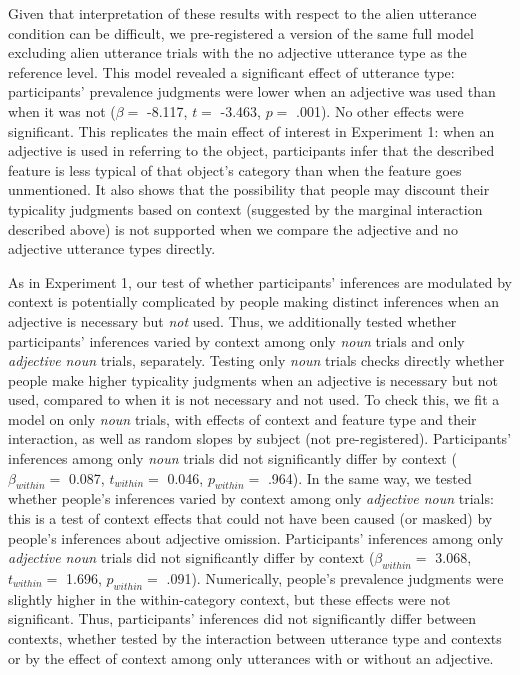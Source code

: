 \documentclass{ucetd}
\begin{document}
Given that interpretation of these results with respect to the alien
utterance condition can be difficult, we pre-registered a version of the
same full model excluding alien utterance trials with the no adjective
utterance type as the reference level. This model revealed a significant
effect of utterance type: participants' prevalence judgments were lower
when an adjective was used than when it was not (\(\beta =\) -8.117,
\(t =\) -3.463, \(p =\) .001). No other effects were significant. This
replicates the main effect of interest in Experiment 1: when an
adjective is used in referring to the object, participants infer that
the described feature is less typical of that object's category than
when the feature goes unmentioned. It also shows that the possibility
that people may discount their typicality judgments based on context
(suggested by the marginal interaction described above) is not supported
when we compare the adjective and no adjective utterance types directly.

As in Experiment 1, our test of whether participants' inferences are
modulated by context is potentially complicated by people making
distinct inferences when an adjective is necessary but \emph{not} used.
Thus, we additionally tested whether participants' inferences varied by
context among only \emph{noun} trials and only \emph{adjective noun}
trials, separately. Testing only \emph{noun} trials checks directly
whether people make higher typicality judgments when an adjective is
necessary but not used, compared to when it is not necessary and not
used. To check this, we fit a model on only \emph{noun} trials, with
effects of context and feature type and their interaction, as well as
random slopes by subject (not pre-registered). Participants' inferences
among only \emph{noun} trials did not significantly differ by context
(\(\beta_{within} =\) 0.087, \(t_{within} =\) 0.046, \(p_{within} =\)
.964). In the same way, we tested whether people's inferences varied by
context among only \emph{adjective noun} trials: this is a test of
context effects that could not have been caused (or masked) by people's
inferences about adjective omission. Participants' inferences among only
\emph{adjective noun} trials did not significantly differ by context
(\(\beta_{within} =\) 3.068, \(t_{within} =\) 1.696, \(p_{within} =\)
.091). Numerically, people's prevalence judgments were slightly higher
in the within-category context, but these effects were not significant.
Thus, participants' inferences did not significantly differ between
contexts, whether tested by the interaction between utterance type and
contexts or by the effect of context among only utterances with or
without an adjective.
\end{document}
